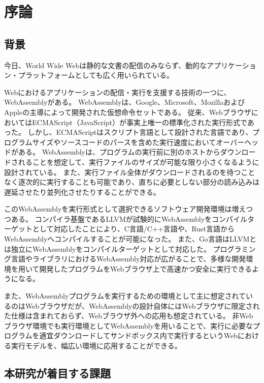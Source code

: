 \chapter{序論}
\label{chap:introduction}

\section{背景}
\label{section:background}

今日、World Wide Webは静的な文書の配信のみならず、動的なアプリケーション・プラットフォームとしても広く用いられている。

Webにおけるアプリケーションの配信・実行を支援する技術の一つに、WebAssemblyがある。
WebAssemblyは、Google、Microsoft、MozillaおよびAppleの主導によって開発された仮想命令セットである\cite{webassembly}。
従来、WebブラウザにおいてはECMAScript（JavaScript）が事実上唯一の標準化された実行形式であった。
しかし、ECMAScriptはスクリプト言語として設計された言語であり\cite{ecma2018}、プログラムサイズやソースコードのパースを含めた実行速度においてオーバーヘッドがある。
WebAssemblyは、プログラムの実行前に別のホストからダウンロードされることを想定して、実行ファイルのサイズが可能な限り小さくなるように設計されている。
また、実行ファイル全体がダウンロードされるのを待つことなく逐次的に実行することも可能であり、直ちに必要としない部分の読み込みは遅延させたり並列化させたりすることができる。

このWebAssemblyを実行形式として選択できるソフトウェア開発環境は増えつつある。
コンパイラ基盤であるLLVMが試験的にWebAssemblyをコンパイルターゲットとして対応した\cite{}ことにより、C言語/C++言語や、Rust言語\cite{rust_wasm}からWebAssemblyへコンパイルすることが可能になった。
また、Go言語はLLVMとは独立にWebAssemblyをコンパイルターゲットとして対応した\cite{go_wasm}。
プログラミング言語やライブラリにおけるWebAssembly対応が広がることで、多様な開発環境を用いて開発したプログラムをWebブラウザ上で高速かつ安全に実行できるようになる。

また、WebAssemblyプログラムを実行するための環境として主に想定されているのはWebブラウザだが、WebAssemblyの設計自体にはWebブラウザに限定された仕様は含まれておらず、Webブラウザ外への応用も想定されている。
非Webブラウザ環境でも実行環境としてWebAssemblyを用いることで、実行に必要なプログラムを適宜ダウンロードしてサンドボックス内で実行するというWebにおける実行モデルを、幅広い環境に応用することができる。

\section{本研究が着目する課題}

